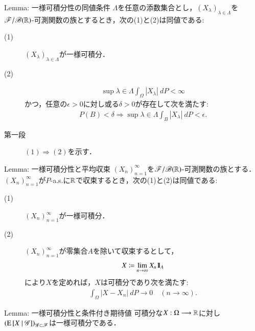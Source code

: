 	\begin{itembox}[l]{Lemma: 一様可積分性の同値条件}
		$\Lambda$を任意の添数集合とし，$(X_\lambda)_{\lambda \in \Lambda}$を
		$\mathscr{F}/\mathscr{B}(\mathbb{R})$-可測関数の族とするとき，次の(1)と(2)は同値である:
		\begin{description}
			\item[(1)] $(X_\lambda)_{\lambda \in \Lambda}$が一様可積分．
			\item[(2)] 
				\begin{align}
					\sup{\lambda \in \Lambda}\int_\Omega |X_\lambda|\ dP < \infty
				\end{align}
				かつ，任意の$\epsilon > 0$に対し或る$\delta > 0$が存在して次を満たす:
				\begin{align}
					P(B) < \delta
					\Rightarrow \sup{\lambda \in \Lambda}\int_B |X_\lambda|\ dP < \epsilon.
				\end{align}
		\end{description}
	\end{itembox}
	
	\begin{prf}\mbox{}
		\begin{description}
			\item[第一段]
				$(1) \Rightarrow (2)$を示す．
		\end{description}
	\end{prf}
	
	\begin{itembox}[l]{Lemma: 一様可積分性と平均収束}
		$(X_n)_{n=1}^\infty$を$\mathscr{F}/\mathscr{B}(\mathbb{R})$-可測関数の族とする．
		$(X_n)_{n=1}^\infty$が$P$-a.s.に$\mathbb{R}$で収束するとき，次の(1)と(2)は同値である:
		\begin{description}
			\item[(1)] $(X_n)_{n=1}^\infty$が一様可積分．
			\item[(2)] $(X_n)_{n=1}^\infty$が零集合$A$を除いて収束するとして，
				\begin{align}
					X \coloneqq \lim_{n \to \infty} X_n \mbox{1}\hspace{-0.25em}\mbox{l}_A
				\end{align}
				により$X$を定めれば，$X$は可積分であり次を満たす:
				\begin{align}
					\int_\Omega |X - X_n|\ dP 
					\longrightarrow 0
					\quad (n \longrightarrow \infty).
				\end{align}
		\end{description}
	\end{itembox}
	
	\begin{itembox}[l]{Lemma: 一様可積分性と条件付き期待値}\label{lem:uniformly_integrability_and_conditional_expectations}
		可積分な$X:\Omega \longrightarrow \mathbb{R}$に対し$\left( \operatorname{E} \left[ X \ \middle|\ \mathscr{G} \right] \right)_{\mathscr{G} \subset \mathscr{F}}$は一様可積分である．
	\end{itembox}
	
